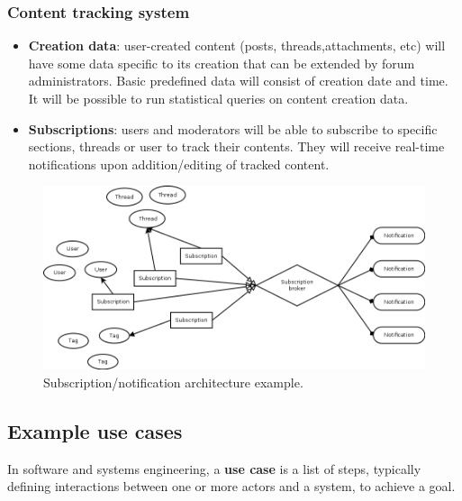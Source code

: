 \documentclass[12pt]{report}
\renewcommand\emph{\textbf}
\begin{document}
                      \subsubsection{Content tracking system}
                        \begin{itemize}
                            \item \emph{Creation data}: user-created content (posts, threads,attachments, etc) will have some data specific to its creation that can be extended by forum administrators. Basic predefined data will consist of creation date and time. It will be possible to run statistical queries on content creation data.
                            \item \emph{Subscriptions}: users and moderators will be able to subscribe to specific sections, threads or user to track their contents. They will receive real-time notifications upon addition/editing of tracked content.
                        \end{itemize}

                        \begin{figure}[!htb]
                        \caption{Subscription/notification architecture example.}
                        \centering
                        \includegraphics[width=1\textwidth]{ed/hier_sub}
                        \end{figure}

                \newpage

                \subsection{Example use cases}
                    In software and systems engineering, a \emph{use case} is a list of steps, typically defining interactions between one or more actors and a system, to achieve a goal.
\end{document}
